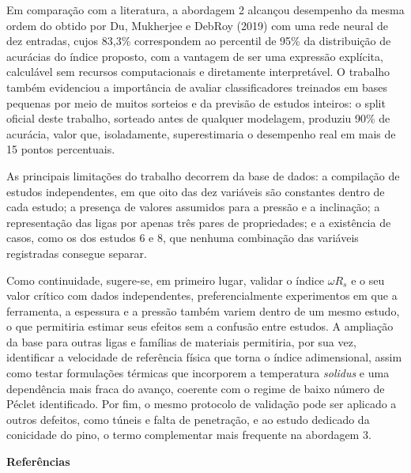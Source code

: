 \documentclass[12pt,openany]{report}
\begin{document}
Em comparação com a literatura, a abordagem 2 alcançou desempenho da mesma ordem do obtido por Du, Mukherjee e DebRoy (2019) com uma rede neural de dez entradas, cujos 83,3\% correspondem ao percentil de 95\% da distribuição de acurácias do índice proposto, com a vantagem de ser uma expressão explícita, calculável sem recursos computacionais e diretamente interpretável. O trabalho também evidenciou a importância de avaliar classificadores treinados em bases pequenas por meio de muitos sorteios e da previsão de estudos inteiros: o split oficial deste trabalho, sorteado antes de qualquer modelagem, produziu 90\% de acurácia, valor que, isoladamente, superestimaria o desempenho real em mais de 15 pontos percentuais.

As principais limitações do trabalho decorrem da base de dados: a compilação de estudos independentes, em que oito das dez variáveis são constantes dentro de cada estudo; a presença de valores assumidos para a pressão e a inclinação; a representação das ligas por apenas três pares de propriedades; e a existência de casos, como os dos estudos 6 e 8, que nenhuma combinação das variáveis registradas consegue separar.

Como continuidade, sugere-se, em primeiro lugar, validar o índice $\omega R_s$ e o seu valor crítico com dados independentes, preferencialmente experimentos em que a ferramenta, a espessura e a pressão também variem dentro de um mesmo estudo, o que permitiria estimar seus efeitos sem a confusão entre estudos. A ampliação da base para outras ligas e famílias de materiais permitiria, por sua vez, identificar a velocidade de referência física que torna o índice adimensional, assim como testar formulações térmicas que incorporem a temperatura \textit{solidus} e uma dependência mais fraca do avanço, coerente com o regime de baixo número de Péclet identificado. Por fim, o mesmo protocolo de validação pode ser aplicado a outros defeitos, como túneis e falta de penetração, e ao estudo dedicado da conicidade do pino, o termo complementar mais frequente na abordagem 3.

\newpage

\begin{center}
    {\fontsize{18}{22}\selectfont\bfseries Referências\par}
\end{center}
\vspace{0.5cm}
\end{document}

